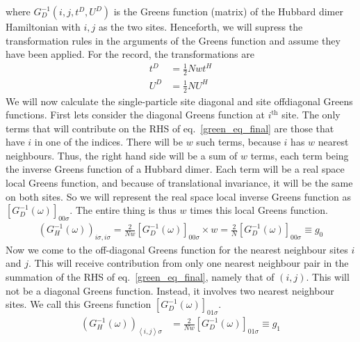 \documentclass[12pt]{article}
\numberwithin{equation}{section}
\begin{document}
where $G_D^{-1}(i,j,t^D,U^D)$ is the Greens function (matrix) of the Hubbard dimer Hamiltonian with $i, j$ as the two sites. Henceforth, we will supress the transformation rules in the arguments of the Greens function and assume they have been applied. For the record, the transformations are
\begin{equation}\begin{aligned}
	t^D &= \frac{1}{2}Nwt^H\\
	U^D &= \frac{1}{2}N U^H
\end{aligned}\end{equation}
We will now calculate the single-particle site diagonal and site offdiagonal Greens functions. First lets consider the diagonal Greens function at $i^\text{th}$ site. The only terms that will contribute on the RHS of eq.~\ref{green_eq_final} are those that have $i$ in one of the indices. There will be $w$ such terms, because $i$ has $w$ nearest neighbours. Thus, the right hand side will be a sum of $w$ terms, each term being the inverse Greens function of a Hubbard dimer. Each term will be a real space local Greens function, and because of translational invariance, it will be the same on both sites. So we will represent the real space local inverse Greens function as $\left[G_D^{-1}(\omega)\right]_{00\sigma}$. The entire thing is thus $w$ times this local Greens function.
\begin{equation}\begin{aligned}
	\label{local_gf}
	\left(G_{H}^{-1}(\omega)\right)_{i\sigma,i\sigma} = \frac{2}{Nw}\left[G_{D}^{-1}(\omega)\right]_{00\sigma}\times w = \frac{2}{N}\left[G_{D}^{-1}(\omega)\right]_{00\sigma} \equiv g_0
\end{aligned}\end{equation}
Now we come to the off-diagonal Greens function for the nearest neighbour sites $i$ and $j$. This will receive contribution from only one nearest neighbour pair in the summation of the RHS of eq.~\ref{green_eq_final}, namely that of $\left(i,j\right)$. This will not be a diagonal Greens function. Instead, it involves two nearest neighbour sites. We call this Greens function $\left[G_D^{-1}(\omega)\right]_{01\sigma}$.
\begin{equation}\begin{aligned}
\label{nn_gf}
	\left(G_{H}^{-1}(\omega)\right)_{\left<i,j \right>\sigma} &= \frac{2}{Nw}\left[G_{D}^{-1}(\omega)\right]_{01\sigma} \equiv g_1
\end{aligned}\end{equation}
\end{document}
